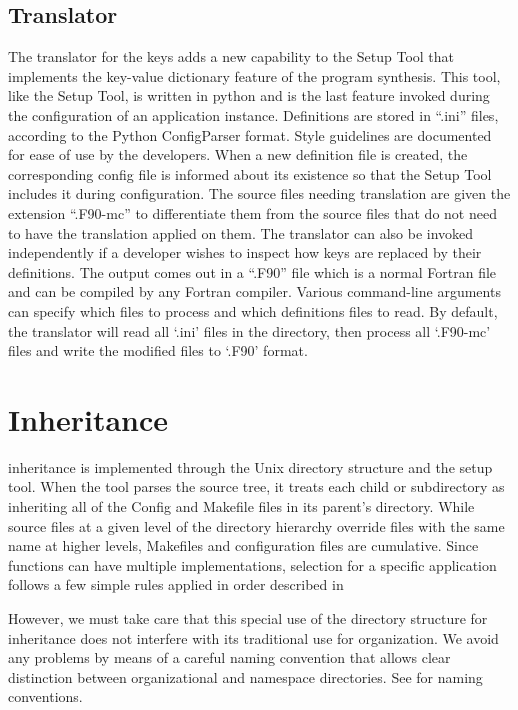 \subsection{Translator}
\label{s.trans}
The translator for the keys adds a new capability 
to the Setup Tool that implements the key-value dictionary feature of the
program synthesis. This tool, like the Setup Tool, is written in
python and is the last feature invoked during the configuration of an application
instance. Definitions are stored in ``.ini'' files, according to the
Python ConfigParser format. Style guidelines are documented for
ease of use by the developers. When a new definition file is created,
the corresponding config file is informed about its existence so that
the Setup Tool includes it during configuration. The source files
needing translation are given the extension ``.F90-mc'' to
differentiate them from the source files that do not need to have the
translation applied on them. The translator can also be invoked
independently if a developer wishes to inspect how keys are replaced
by their definitions. The output comes out in a ``.F90'' file which is
a normal Fortran file and can be compiled by any Fortran
compiler. Various command-line arguments can specify which files to
process and which definitions files to read. By default, the translator will
read all `.ini' files in the directory, then process all `.F90-mc'
files and write the modified files to `.F90' format. 



\section{\flashx Inheritance}
\label{Sec:Inheritance}

\newcommand{\OS}{Unix\xspace}
\flashx inheritance is implemented through the \OS directory structure
and the setup tool. When the
 tool parses the source tree, it treats each 
child or subdirectory 
as inheriting all of the Config and Makefile files 
in its parent's directory. While source files at a given level of
the directory hierarchy override files with the same name at higher
levels, Makefiles and configuration files are
cumulative. 
Since functions can have multiple implementations,
selection for a specific application  follows a few simple rules
applied in order described in %

However, we must take care that this special use of the directory structure for inheritance
does not interfere with its traditional use for organization. We avoid any problems by means
of a careful naming convention that allows clear distinction between organizational and
namespace directories. See  for naming conventions.



